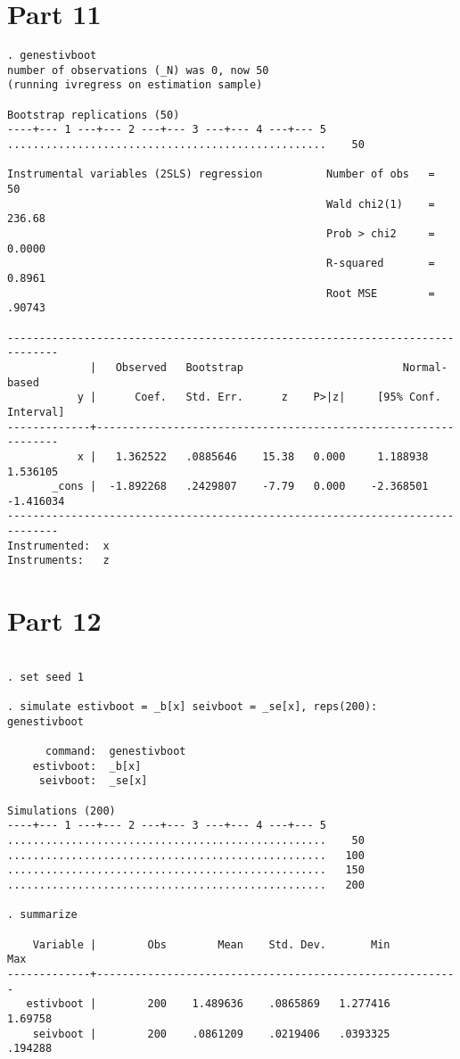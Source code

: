 \documentclass{article}
\begin{document}
\section{Part 11}
\begin{lstlisting}
. genestivboot
number of observations (_N) was 0, now 50
(running ivregress on estimation sample)

Bootstrap replications (50)
----+--- 1 ---+--- 2 ---+--- 3 ---+--- 4 ---+--- 5 
..................................................    50

Instrumental variables (2SLS) regression          Number of obs   =         50
                                                  Wald chi2(1)    =     236.68
                                                  Prob > chi2     =     0.0000
                                                  R-squared       =     0.8961
                                                  Root MSE        =     .90743

------------------------------------------------------------------------------
             |   Observed   Bootstrap                         Normal-based
           y |      Coef.   Std. Err.      z    P>|z|     [95% Conf. Interval]
-------------+----------------------------------------------------------------
           x |   1.362522   .0885646    15.38   0.000     1.188938    1.536105
       _cons |  -1.892268   .2429807    -7.79   0.000    -2.368501   -1.416034
------------------------------------------------------------------------------
Instrumented:  x
Instruments:   z

\end{lstlisting}

\section{Part 12}
\begin{lstlisting}

. set seed 1

. simulate estivboot = _b[x] seivboot = _se[x], reps(200): genestivboot

      command:  genestivboot
    estivboot:  _b[x]
     seivboot:  _se[x]

Simulations (200)
----+--- 1 ---+--- 2 ---+--- 3 ---+--- 4 ---+--- 5 
..................................................    50
..................................................   100
..................................................   150
..................................................   200

. summarize

    Variable |        Obs        Mean    Std. Dev.       Min        Max
-------------+---------------------------------------------------------
   estivboot |        200    1.489636    .0865869   1.277416    1.69758
    seivboot |        200    .0861209    .0219406   .0393325    .194288


\end{lstlisting}
\end{document}
